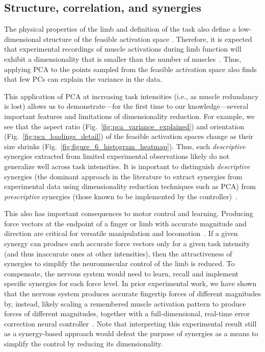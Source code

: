 \documentclass[9pt,twocolumn,twoside,lineno]{pnas-new}
\begin{document}
\subsection*{Structure, correlation, and synergies}

The physical properties of the limb and definition of the task also define a low-dimensional structure of the feasible activation space \cite{valero-cuevas2015fundamentals}. Therefore, it is expected that experimental recordings of muscle activations during limb function will exhibit a dimensionality that is smaller than the number of muscles~\cite{kutch2012challenges,alessandro2013musclesynergies}. Thus, applying PCA to the points sampled from the feasible activation space also finds that few PCs can explain the variance in the data.

This application of PCA at increasing task intensities (i.e., as muscle redundancy is lost) allows us to demonstrate---for the first time to our knowledge---several important features and limitations of dimensionality reduction. For example, we see that the aspect ratio (Fig.~\ref{fig:pca_variance_explained}) and orientation (Fig.~\ref{fig:pca_loadings_detail}) of the feasible activation spaces change as their size shrinks (Fig.~\ref{fig:figure_6_histogram_heatmap}).
Thus, such \emph{descriptive} synergies extracted from limited experimental observations likely do not generalize well across task intensities.
It is important to distinguish \emph{descriptive} synergies (the dominant approach in the literature to extract synergies from experimental data using dimensionality reduction techniques such as PCA) from \emph{prescriptive} synergies (those  known to be implemented by the controller)~\cite{valero-cuevas2015fundamentals}.

This also has important consequences to motor control and learning. Producing force vectors at the endpoint of a finger or limb with accurate magnitude and direction are critical for versatile manipulation and locomotion~\cite{cole2006age,valero1998large,donelan2004mechanical}. If a given synergy can produce such accurate force vectors only for a given task intensity (and thus inaccurate ones at other intensities), then the attractiveness of synergies to simplify the neuromuscular control of the limb is reduced.
To compensate, the nervous system would need to learn, recall and implement specific synergies for each force level. In prior experimental work, we have shown that the nervous system produces accurate fingertip forces of different magnitudes by, instead, likely scaling a remembered muscle activation pattern to produce forces of different magnitudes, together with a full-dimensional, real-time error correction neural controller~\cite{Valero-Cuevas2000Scaling}. Note that interpreting this experimental result still as a synergy-based approach would defeat the purpose of synergies as a means to simplify the control by reducing its dimensionality.
\end{document}
